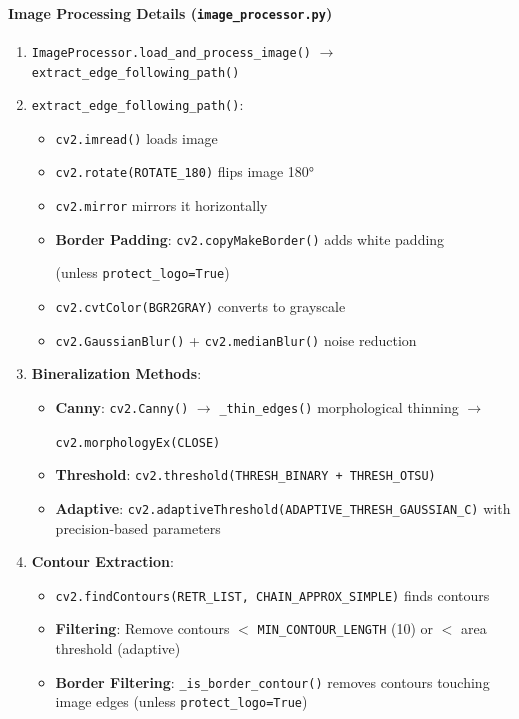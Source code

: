 \documentclass[a4paper,12pt]{article}
\begin{document}
\paragraph{Image Processing Details (\texttt{image\_processor.py})}
\begin{enumerate}
\item \texttt{ImageProcessor.load\_and\_process\_image()} $\rightarrow$ \texttt{extract\_edge\_following\_path()}
\item \texttt{extract\_edge\_following\_path()}:
	\begin{itemize}
	\item \texttt{cv2.imread()} loads image
	\item \texttt{cv2.rotate(ROTATE\_180)} flips image 180°
	\item \texttt{cv2.mirror} mirrors it horizontally
	\item \textbf{Border Padding}: \texttt{cv2.copyMakeBorder()} adds white padding 
    
    (unless \texttt{protect\_logo=True})
	\item \texttt{cv2.cvtColor(BGR2GRAY)} converts to grayscale
	\item \texttt{cv2.GaussianBlur()} + \texttt{cv2.medianBlur()} noise reduction
	\end{itemize}

\item \textbf{Bineralization Methods}:
	\begin{itemize}
	\item \textbf{Canny}: \texttt{cv2.Canny()} $\rightarrow$ \texttt{\_thin\_edges()} morphological thinning $\rightarrow$ 
    
    \texttt{cv2.morphologyEx(CLOSE)}
	\item \textbf{Threshold}: \texttt{cv2.threshold(THRESH\_BINARY + THRESH\_OTSU)}
	\item \textbf{Adaptive}: \texttt{cv2.adaptiveThreshold(ADAPTIVE\_THRESH\_GAUSSIAN\_C)} with precision-based parameters
	\end{itemize}

\item \textbf{Contour Extraction}:
	\begin{itemize}
	\item \texttt{cv2.findContours(RETR\_LIST, CHAIN\_APPROX\_SIMPLE)} finds contours
	\item \textbf{Filtering}: Remove contours $<$ \texttt{MIN\_CONTOUR\_LENGTH} (10) or $<$ area threshold (adaptive)
	\item \textbf{Border Filtering}: \texttt{\_is\_border\_contour()} removes contours touching image edges (unless \texttt{protect\_logo=True})
	\end{itemize}


\end{enumerate}
\end{document}

